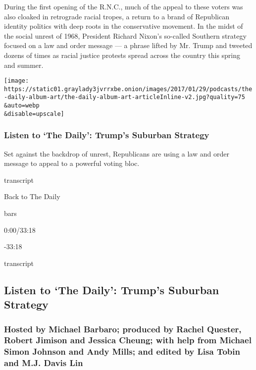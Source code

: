 During the first opening of the R.N.C., much of the appeal to these
voters was also cloaked in retrograde racial tropes, a return to a brand
of Republican identity politics with deep roots in the conservative
movement. In the midst of the social unrest of 1968, President Richard
Nixon's so-called Southern strategy focused on a law and order message
--- a phrase lifted by Mr. Trump and tweeted dozens of times as racial
justice protests spread across the country this spring and summer.

\texttt{[image: https://static01.graylady3jvrrxbe.onion/images/2017/01/29/podcasts/the-daily-album-art/the-daily-album-art-articleInline-v2.jpg?quality=75\\\&auto=webp\\\&disable=upscale]}

\hypertarget{listen-to-the-daily-trumps-suburban-strategy}{%
\subsubsection{Listen to `The Daily': Trump's Suburban
Strategy}\label{listen-to-the-daily-trumps-suburban-strategy}}

Set against the backdrop of unrest, Republicans are using a law and
order message to appeal to a powerful voting bloc.

transcript

Back to The Daily

bars

0:00/33:18

-33:18

transcript

\hypertarget{listen-to-the-daily-trumps-suburban-strategy-1}{%
\subsection{Listen to `The Daily': Trump's Suburban
Strategy}\label{listen-to-the-daily-trumps-suburban-strategy-1}}

\hypertarget{hosted-by-michael-barbaro-produced-by-rachel-quester-robert-jimison-and-jessica-cheung-with-help-from-michael-simon-johnson-and-andy-mills-and-edited-by-lisa-tobin-and-mj-davis-lin}{%
\subsubsection{Hosted by Michael Barbaro; produced by Rachel Quester,
Robert Jimison and Jessica Cheung; with help from Michael Simon Johnson
and Andy Mills; and edited by Lisa Tobin and M.J. Davis
Lin}\label{hosted-by-michael-barbaro-produced-by-rachel-quester-robert-jimison-and-jessica-cheung-with-help-from-michael-simon-johnson-and-andy-mills-and-edited-by-lisa-tobin-and-mj-davis-lin}}


